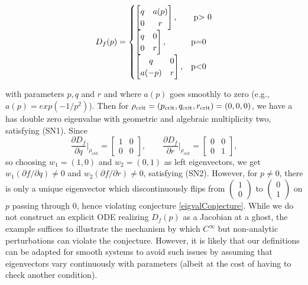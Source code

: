 \documentclass{article}
\theoremstyle{definition}
\begin{document}
\begin{refsection}
\begin{align*}
D_f(p) = \label{eq:2}
\begin{cases}
\begin{bmatrix}
q & a(p) \\
0 & r
\end{bmatrix}, & $ p> 0$ \\[6pt]
\begin{bmatrix}
q & 0 \\
0 & r
\end{bmatrix}, & $p=0$ \\
\begin{bmatrix}
q & 0 \\
a(-p)
& r
\end{bmatrix}, & $p<0$\\
\end{cases}
\end{align*}

with parameters $p, q$ and $r$ and where $a(p)$ goes smoothly to zero (e.g., $a(p)=exp(-1/p^2)$). Then for $\rho_{\textnormal{crit}}=(p_{\textnormal{crit}},q_{\textnormal{crit}},r_{\textnormal{crit}})=(0,0,0)$, we have a
has double zero eigenvalue with geometric and algebraic multiplicity two, satisfying (SN1). Since \begin{equation*}
\frac{\partial D_f}{\partial q}\bigg|_{\rho_\textrm{crit}} = 
\begin{bmatrix}1&0\\0&0\end{bmatrix}, \qquad 
\frac{\partial D_f}{\partial r}\bigg|_{\rho_\textrm{crit}} = 
\begin{bmatrix}0&0\\0&1\end{bmatrix},
\end{equation*}
so choosing $w_1 = (1,0)$ and $w_2=(0,1)$ as left eigenvectors, we get 
$w_1(\partial f/\partial q)\neq 0$ and $w_2(\partial f/\partial r)\neq 0$, 
satisfying (SN2). However, for $p\neq0$, there is only a unique eigenvector which discontinuously flips from $\begin{pmatrix} 1\\0\end{pmatrix}$ to $\begin{pmatrix} 0\\1\end{pmatrix}$ on $p$ passing through $0$, hence violating conjecture \ref{eigvalConjecture}. While we do not construct an explicit ODE realizing $D_f(p)$ as a Jacobian at a ghost, the example suffices to illustrate the mechanism by which $C^\infty$ but non-analytic perturbations can violate the conjecture. However, it is likely that our definitions can be adapted for smooth systems to avoid such issues by assuming that eigenvectors vary continuously with parameters (albeit at the cost of having to check another condition).


\end{refsection}
\end{document}
